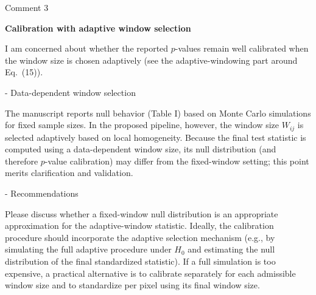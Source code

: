 \documentclass[11pt]{report}
\begin{document}
\begin{reviewbox}{Comment 3}

\textbf{Calibration with adaptive window selection}

I am concerned about whether the reported $p$-values remain well calibrated when the window size is chosen adaptively (see the adaptive-windowing part around Eq.~(15)).

- Data-dependent window selection

The manuscript reports null behavior (Table I) based on Monte Carlo simulations for fixed sample sizes. In the proposed pipeline, however, the window size $W_{ij}$ is selected adaptively based on local homogeneity. Because the final test statistic is computed using a data-dependent window size, its null distribution (and therefore $p$-value calibration) may differ from the fixed-window setting; this point merits clarification and validation.

- Recommendations

Please discuss whether a fixed-window null distribution is an appropriate approximation for the adaptive-window statistic. Ideally, the calibration procedure should incorporate the adaptive selection mechanism (e.g., by simulating the full adaptive procedure under $H_0$ and estimating the null distribution of the final standardized statistic). If a full simulation is too expensive, a practical alternative is to calibrate separately for each admissible window size and to standardize per pixel using its final window size.

\end{reviewbox}
\end{document}
